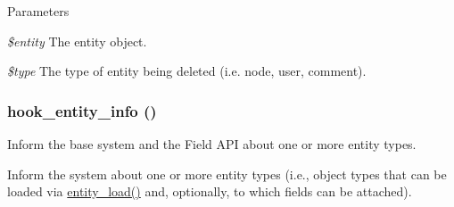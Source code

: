 \begin{DoxyParams}{Parameters}
\item[{\em \$entity}]The entity object. \item[{\em \$type}]The type of entity being deleted (i.e. node, user, comment). \end{DoxyParams}
\hypertarget{group__hooks_gaf02318e9d0e8cdbf6d187b271b9969a8}{
\subsubsection[{hook\_\-entity\_\-info}]{\setlength{\rightskip}{0pt plus 5cm}hook\_\-entity\_\-info ()}}
\label{group__hooks_gaf02318e9d0e8cdbf6d187b271b9969a8}
Inform the base system and the Field API about one or more entity types.

Inform the system about one or more entity types (i.e., object types that can be loaded via \hyperlink{common_8inc_a78b89cf93f9710a68d02f86adccf1898}{entity\_\-load()} and, optionally, to which fields can be attached).

